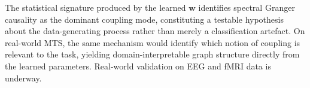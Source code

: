 \documentclass{article}
\theoremstyle{plain}
\begin{document}
The statistical signature produced by the learned $\mathbf{w}$ identifies spectral Granger causality as the dominant coupling mode, constituting a testable hypothesis about the data-generating process rather than merely a classification artefact. On real-world MTS, the same mechanism would identify which notion of coupling is relevant to the task, yielding domain-interpretable graph structure directly from the learned parameters. Real-world validation on EEG and fMRI data is underway.



\end{document}
